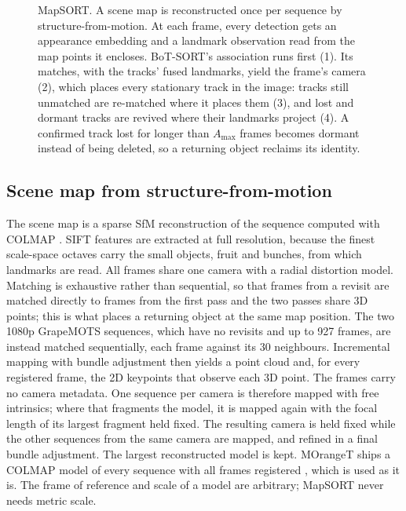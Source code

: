 \documentclass[pdflatex,sn-basic]{sn-jnl}%
\theoremstyle{thmstyleone}%
\begin{document}
\begin{figure}[t]
{}
\caption{MapSORT. A scene map is reconstructed once per sequence by structure-from-motion. At each frame, every detection gets an appearance embedding and a landmark observation read from the map points it encloses. BoT-SORT's association runs first (1). Its matches, with the tracks' fused landmarks, yield the frame's camera (2), which places every stationary track in the image: tracks still unmatched are re-matched where it places them (3), and lost and dormant tracks are revived where their landmarks project (4). A confirmed track lost for longer than $A_{\max}$ frames becomes dormant instead of being deleted, so a returning object reclaims its identity.}
\label{fig:arch}
\end{figure}

\subsection{Scene map from structure-from-motion}\label{sec:map}

The scene map is a sparse SfM reconstruction of the sequence computed with COLMAP \citep{schonberger2016colmap}. SIFT features \citep{lowe2004sift} are extracted at full resolution, because the finest scale-space octaves carry the small objects, fruit and bunches, from which landmarks are read. All frames share one camera with a radial distortion model. Matching is exhaustive rather than sequential, so that frames from a revisit are matched directly to frames from the first pass and the two passes share 3D points; this is what places a returning object at the same map position. The two 1080p GrapeMOTS sequences, which have no revisits and up to 927 frames, are instead matched sequentially, each frame against its 30 neighbours. Incremental mapping with bundle adjustment then yields a point cloud and, for every registered frame, the 2D keypoints that observe each 3D point. The frames carry no camera metadata. One sequence per camera is therefore mapped with free intrinsics; where that fragments the model, it is mapped again with the focal length of its largest fragment held fixed. The resulting camera is held fixed while the other sequences from the same camera are mapped, and refined in a final bundle adjustment. The largest reconstructed model is kept. MOrangeT ships a COLMAP model of every sequence with all frames registered \citep{santos2024moranget}, which is used as it is. The frame of reference and scale of a model are arbitrary; MapSORT never needs metric scale.
\end{document}
